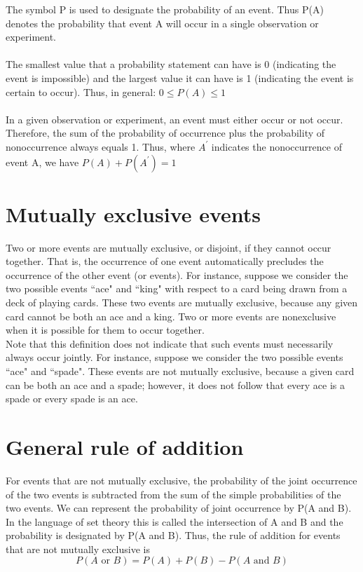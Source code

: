 \documentclass[12pt]{article}
\begin{document}
The symbol P is used to designate the probability of an event. Thus P(A) denotes the probability that event
A will occur in a single observation or experiment.
\\
\\
The smallest value that a probability statement can have is 0 (indicating the event is impossible) and the
largest value it can have is 1 (indicating the event is certain to occur). Thus, in general:
$0 	\leq P(A) \leq 1$
\\
\\
In a given observation or experiment, an event must either occur or not occur. Therefore, the sum of the
probability of occurrence plus the probability of nonoccurrence always equals 1. Thus, where $A^{\prime}$ indicates the nonoccurrence of event A, we have
$P(A) + P(A^{\prime}) =  1$

\section*{Mutually exclusive events}
Two or more events are mutually exclusive, or disjoint, if they cannot occur together. That is, the occurrence
of one event automatically precludes the occurrence of the other event (or events). For instance, suppose we
consider the two possible events ``ace" and ``king" with respect to a card being drawn from a deck of playing
cards. These two events are mutually exclusive, because any given card cannot be both an ace and a king.
Two or more events are nonexclusive when it is possible for them to occur together. 
\\
Note that this definition does not indicate that such events must necessarily always occur jointly. For instance, suppose we consider the two possible events ``ace" and ``spade". These events are not mutually exclusive, because a given card can be both an ace and a spade; however, it does not follow that every ace is a spade or every spade is an ace.
\section*{General rule of addition}
For events that are not mutually exclusive, the probability of the joint occurrence of the two events is
subtracted from the sum of the simple probabilities of the two events. We can represent the probability of joint
occurrence by P(A and B). In the language of set theory this is called the intersection of A and B and the
probability is designated by P(A and B).  Thus, the rule of addition for events that are not mutually exclusive is
\[ P(A \mbox{ or }B) = P(A)+ P(B) - P(A \mbox{ and }B)\]
\end{document}
